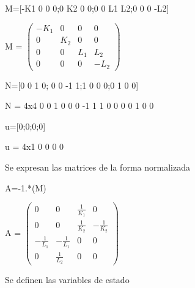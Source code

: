 \documentclass[10pt,a4paper]{article} %
\begin{document}
\begin{matlabcode}
	M=[-K1 0 0 0;0 K2 0 0;0 0 L1 L2;0 0 0 -L2]
\end{matlabcode}
\begin{matlabsymbolicoutput}
	M = 
	$\displaystyle \left(\begin{array}{cccc}
	-K_1  & 0 & 0 & 0\\
	0 & K_2  & 0 & 0\\
	0 & 0 & L_1  & L_2 \\
	0 & 0 & 0 & -L_2 
	\end{array}\right)$
\end{matlabsymbolicoutput}
\begin{matlabcode}
	N=[0 0 1 0; 0 0 -1 1;1 0 0 0;0 1 0 0]
\end{matlabcode}
\begin{matlaboutput}
	N = 4x4    
	0     0     1     0
	0     0    -1     1
	1     0     0     0
	0     1     0     0
	
\end{matlaboutput}
\begin{matlabcode}
	u=[0;0;0;0]
\end{matlabcode}
\begin{matlaboutput}
	u = 4x1    
	0
	0
	0
	0
	
\end{matlaboutput}

\begin{par}
	\begin{flushleft}
		Se expresan las matrices de la forma normalizada
	\end{flushleft}
\end{par}

\begin{matlabcode}
	A=-1.*(M\N)
\end{matlabcode}
\begin{matlabsymbolicoutput}
	A = 
	$\displaystyle \left(\begin{array}{cccc}
	0 & 0 & \frac{1}{K_1 } & 0\\
	0 & 0 & \frac{1}{K_2 } & -\frac{1}{K_2 }\\
	-\frac{1}{L_1 } & -\frac{1}{L_1 } & 0 & 0\\
	0 & \frac{1}{L_2 } & 0 & 0
	\end{array}\right)$
\end{matlabsymbolicoutput}

\begin{par}
	\begin{flushleft}
		Se definen las variables de estado
	\end{flushleft}
\end{par}
\end{document}
